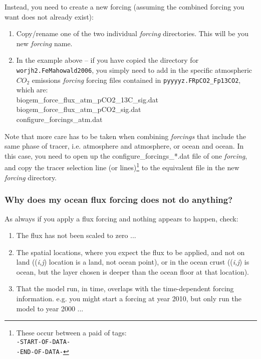 \documentclass[11pt,fleqn]{book} %
\begin{document}
Instead, you need to create a new forcing (assuming the combined forcing you want does not already exist):
\begin{enumerate}[noitemsep]
\setlength{\itemindent}{.2in}
\item Copy/rename one of the two individual \textit{forcing} directories. This will be you new \textit{forcing} name.
\item In the example above -- if you have copied the directory for \texttt{worjh2.FeMahowald2006}, you simply need to add in the specific atmospheric \(CO_{2}\) emissions \textit{forcing} forcing files contained in \texttt{pyyyyz.FRpCO2\_Fp13CO2}, which are:
\\\footnotesize\textsf{
biogem\_force\_flux\_atm\_pCO2\_13C\_sig.dat\\
biogem\_force\_flux\_atm\_pCO2\_sig.dat\\
configure\_forcings\_atm.dat
}\normalsize
\end{enumerate}
Note that more care has to be taken when combining \textit{forcings} that include the same phase of tracer, i.e. atmosphere and atmosphere, or ocean and ocean. In this case, you need to open up the \textsf{\footnotesize configure\_forcings\_*.dat} file of one \textit{forcing}, and copy the tracer selection line (or lines)\footnote{These occur between a paid of tags:
\\\texttt{-START-OF-DATA-
\\-END-OF-DATA-}}
to the equivalent file in the new \textit{forcing} directory.

%
\subsubsection{Why does my ocean flux forcing does not do anything?}

As always if you apply a flux forcing and nothing appears to happen, check:

\begin{enumerate}[noitemsep]
\item The flux has not been scaled to zero ...
\item The spatial locations, where you expect the flux to be applied, and not on land ((\textit{i,j}) location is a land, not ocean point), or in the ocean crust ((\textit{i,j}) is ocean, but the layer chosen is deeper than the ocean floor at that location).
\item That the model run, in time, overlaps with the time-dependent forcing information. e.g. you might start a forcing at year 2010, but only run the model to year 2000 ...
\end{enumerate}
\end{document}
